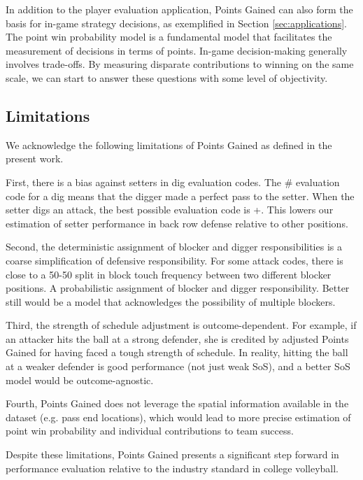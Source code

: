 \documentclass{article}
\begin{document}
In addition to the player evaluation application, Points Gained can also form the basis for in-game strategy decisions, as exemplified in Section \ref{sec:applications}. The point win probability model is a fundamental model that facilitates the measurement of decisions in terms of points. In-game decision-making generally involves trade-offs. By measuring disparate contributions to winning on the same scale, we can start to answer these questions with some level of objectivity.


\subsection{Limitations}
\label{sec:limitations}

We acknowledge the following limitations of Points Gained as defined in the present work.

First, there is a bias against setters in dig evaluation codes. The \# evaluation code for a dig means that the digger made a perfect pass to the setter. When the setter digs an attack, the best possible evaluation code is +. This lowers our estimation of setter performance in back row defense relative to other positions.

Second, the deterministic assignment of blocker and digger responsibilities is a coarse simplification of defensive responsibility. For some attack codes, there is close to a 50-50 split in block touch frequency between two different blocker positions. A probabilistic assignment of blocker and digger responsibility. Better still would be a model that acknowledges the possibility of multiple blockers.

Third, the strength of schedule adjustment is outcome-dependent. For example, if an attacker hits the ball at a strong defender, she is credited by adjusted Points Gained for having faced a tough strength of schedule. In reality, hitting the ball at a weaker defender is good performance (not just weak SoS), and a better SoS model would be outcome-agnostic.

Fourth, Points Gained does not leverage the spatial information available in the dataset (e.g. pass end locations), which would lead to more precise estimation of point win probability and individual contributions to team success.

Despite these limitations, Points Gained presents a significant step forward in performance evaluation relative to the industry standard in college volleyball.


\end{document}
